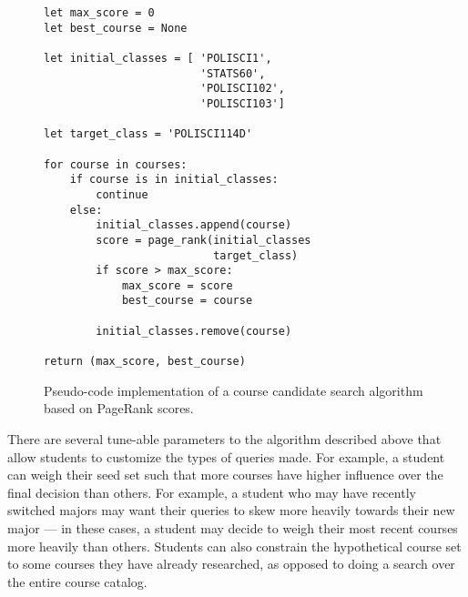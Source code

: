 \lstset{language=Python}          %

\begin{figure}
    \begin{lstlisting}[frame=single] 
let max_score = 0
let best_course = None 

let initial_classes = [ 'POLISCI1',
                        'STATS60',
                        'POLISCI102',
                        'POLISCI103']
                        
let target_class = 'POLISCI114D'

for course in courses:
    if course is in initial_classes:
        continue
    else:
        initial_classes.append(course)
        score = page_rank(initial_classes
                          target_class)
        if score > max_score:
            max_score = score
            best_course = course
        
        initial_classes.remove(course)

return (max_score, best_course)
\end{lstlisting}
\caption{Pseudo-code implementation of a course candidate search algorithm based on PageRank scores.}
\label{fig:course-recommendation-algorithm}
\end{figure}


There are several tune-able parameters to the algorithm described above that allow students to customize the types of queries made. For example, a student can weigh their seed set such that more courses have higher influence over the final decision than others. For example, a student who may have recently switched majors may want their queries to skew more heavily towards their new major --- in these cases, a student may decide to weigh their most recent courses more heavily than others. Students can also constrain the hypothetical course set to some courses they have already researched, as opposed to doing a search over the entire course catalog.
